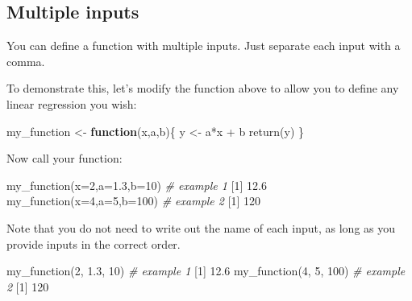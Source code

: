 \documentclass[
]{book}
\newenvironment{Shaded}{\begin{snugshade}}{\end{snugshade}}
\newcommand{\AttributeTok}[1]{\textcolor[rgb]{0.77,0.63,0.00}{#1}}
\newcommand{\CommentTok}[1]{\textcolor[rgb]{0.56,0.35,0.01}{\textit{#1}}}
\newcommand{\ControlFlowTok}[1]{\textcolor[rgb]{0.13,0.29,0.53}{\textbf{#1}}}
\newcommand{\DecValTok}[1]{\textcolor[rgb]{0.00,0.00,0.81}{#1}}
\newcommand{\FloatTok}[1]{\textcolor[rgb]{0.00,0.00,0.81}{#1}}
\newcommand{\FunctionTok}[1]{\textcolor[rgb]{0.00,0.00,0.00}{#1}}
\newcommand{\NormalTok}[1]{#1}
\newcommand{\OtherTok}[1]{\textcolor[rgb]{0.56,0.35,0.01}{#1}}
\newcommand{\SpecialCharTok}[1]{\textcolor[rgb]{0.00,0.00,0.00}{#1}}
\begin{document}
\hypertarget{multiple-inputs}{%
\subsection*{Multiple inputs}\label{multiple-inputs}}

You can define a function with multiple inputs. Just separate each input with a comma.

To demonstrate this, let's modify the function above to allow you to define any linear regression you wish:

\begin{Shaded}
\begin{Highlighting}[]
\NormalTok{my\_function }\OtherTok{\textless{}{-}} \ControlFlowTok{function}\NormalTok{(x,a,b)\{}
\NormalTok{  y }\OtherTok{\textless{}{-}}\NormalTok{ a}\SpecialCharTok{*}\NormalTok{x }\SpecialCharTok{+}\NormalTok{ b}
  \FunctionTok{return}\NormalTok{(y)}
\NormalTok{\}}
\end{Highlighting}
\end{Shaded}

Now call your function:

\begin{Shaded}
\begin{Highlighting}[]
\FunctionTok{my\_function}\NormalTok{(}\AttributeTok{x=}\DecValTok{2}\NormalTok{,}\AttributeTok{a=}\FloatTok{1.3}\NormalTok{,}\AttributeTok{b=}\DecValTok{10}\NormalTok{) }\CommentTok{\# example 1}
\NormalTok{[}\DecValTok{1}\NormalTok{] }\FloatTok{12.6}
\FunctionTok{my\_function}\NormalTok{(}\AttributeTok{x=}\DecValTok{4}\NormalTok{,}\AttributeTok{a=}\DecValTok{5}\NormalTok{,}\AttributeTok{b=}\DecValTok{100}\NormalTok{) }\CommentTok{\# example 2}
\NormalTok{[}\DecValTok{1}\NormalTok{] }\DecValTok{120}
\end{Highlighting}
\end{Shaded}

Note that you do not need to write out the name of each input, as long as you provide inputs in the correct order.

\begin{Shaded}
\begin{Highlighting}[]
\FunctionTok{my\_function}\NormalTok{(}\DecValTok{2}\NormalTok{, }\FloatTok{1.3}\NormalTok{, }\DecValTok{10}\NormalTok{) }\CommentTok{\# example 1}
\NormalTok{[}\DecValTok{1}\NormalTok{] }\FloatTok{12.6}
\FunctionTok{my\_function}\NormalTok{(}\DecValTok{4}\NormalTok{, }\DecValTok{5}\NormalTok{, }\DecValTok{100}\NormalTok{) }\CommentTok{\# example 2}
\NormalTok{[}\DecValTok{1}\NormalTok{] }\DecValTok{120}
\end{Highlighting}
\end{Shaded}
\end{document}
